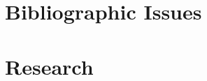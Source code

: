 \documentclass[a4paper,11pt,twoside]{memoir}
\begin{document}
\chapter{Bibliographic Issues}
\label{ch:bibliographic}




\chapter{Research}
\label{ch:research}




\appendix





\end{document}
